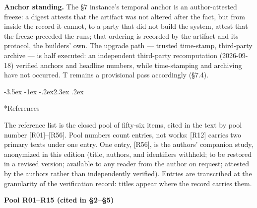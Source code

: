 \documentclass[11pt,a4paper]{article}
\makeatletter
\renewcommand\section{\@startsection{section}{1}{\z@}%
  {-3.5ex \@plus -1ex \@minus -.2ex}{2.3ex \@plus .2ex}%
  {\normalfont\Large\bfseries\raggedright}}
\makeatother
\begin{document}
\textbf{Anchor standing.} The §7 instance's temporal anchor is an author-attested freeze: a digest attests that the artifact was not altered after the fact, but from inside the record it cannot, to a party that did not build the system, attest that the freeze preceded the runs; that ordering is recorded by the artifact and its protocol, the builders' own. The upgrade path — trusted time-stamp, third-party archive — is half executed: an independent third-party recomputation (2026-09-18) verified anchors and headline numbers, while time-stamping and archiving have not occurred. T remains a provisional pass accordingly (§7.4).

\section*{References}

The reference list is the closed pool of fifty-six items, cited in the text by pool number [R01]–[R56]. Pool numbers count entries, not works: [R12] carries two primary texts under one entry. One entry, [R56], is the authors' companion study, anonymized in this edition (title, authors, and identifiers withheld; to be restored in a revised version; available to any reader from the author on request; attested by the authors rather than independently verified). Entries are transcribed at the granularity of the verification record: titles appear where the record carries them.

\medskip
\noindent\textbf{Pool R01–R15 (cited in §2–§5)}\par\addvspace{2pt}
\end{document}
